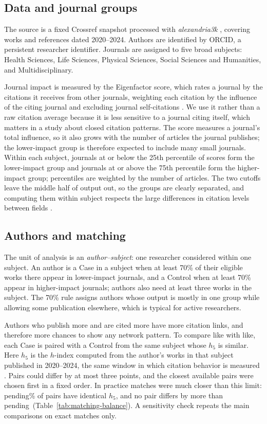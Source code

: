 \documentclass[12pt]{article}
\providecommand{\ExactHFivePairPercent}{pending}
\providecommand{\MaximumAbsoluteHFiveDifference}{pending}
\begin{document}
\subsection{Data and journal groups}
\label{sec:data}

The source is a fixed Crossref snapshot processed with \textit{alexandria3k} \parencite{Spinellis2023}, covering works and references dated 2020--2024.  Authors are identified by ORCID, a persistent researcher identifier.  Journals are assigned to five broad subjects: Health Sciences, Life Sciences, Physical Sciences, Social Sciences and Humanities, and Multidisciplinary.

Journal impact is measured by the Eigenfactor score, which rates a journal by the citations it receives from other journals, weighting each citation by the influence of the citing journal and excluding journal self-citations \parencite{West2008}.  We use it rather than a raw citation average because it is less sensitive to a journal citing itself, which matters in a study about closed citation patterns.  The score measures a journal's total influence, so it also grows with the number of articles the journal publishes; the lower-impact group is therefore expected to include many small journals.  Within each subject, journals at or below the 25th percentile of scores form the lower-impact group and journals at or above the 75th percentile form the higher-impact group; percentiles are weighted by the number of articles.  The two cutoffs leave the middle half of output out, so the groups are clearly separated, and computing them within subject respects the large differences in citation levels between fields \parencite{Waltman2016}.

\subsection{Authors and matching}
\label{sec:matching}

The unit of analysis is an \emph{author--subject}: one researcher considered within one subject.  An author is a Case in a subject when at least 70\% of their eligible works there appear in lower-impact journals, and a Control when at least 70\% appear in higher-impact journals; authors also need at least three works in the subject.  The 70\% rule assigns authors whose output is mostly in one group while allowing some publication elsewhere, which is typical for active researchers.

Authors who publish more and are cited more have more citation links, and therefore more chances to show any network pattern.  To compare like with like, each Case is paired with a Control from the same subject whose $h_5$ is similar.  Here $h_5$ is the $h$-index computed from the author's works in that subject published in 2020--2024, the same window in which citation behavior is measured \parencite{Hirsch2005}.  Pairs could differ by at most three points, and the closest available pairs were chosen first in a fixed order.  In practice matches were much closer than this limit: \ExactHFivePairPercent\% of pairs have identical $h_5$, and no pair differs by more than \MaximumAbsoluteHFiveDifference\ (Table~\ref{tab:matching-balance}).  A sensitivity check repeats the main comparisons on exact matches only.
\end{document}
